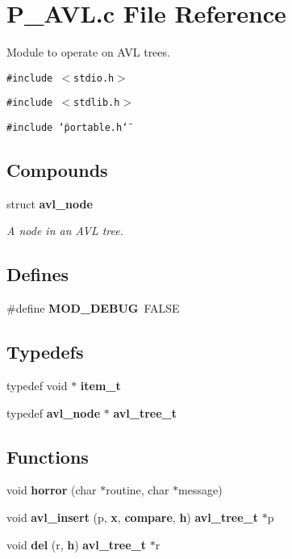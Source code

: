 \section{P\_\-AVL.c File Reference}
\label{P__AVL_8c}
Module to operate on AVL trees. 


{\tt \#include $<$stdio.h$>$}\par
{\tt \#include $<$stdlib.h$>$}\par
{\tt \#include \char`\"{}portable.h\char`\"{}}\par
\subsection*{Compounds}
\begin{CompactItemize}
\item 
struct {\bf avl\_\-node}
\begin{CompactList}\small\item\em A node in an AVL tree.\item\end{CompactList}\end{CompactItemize}
\subsection*{Defines}
\begin{CompactItemize}
\item 
\#define {\bf MOD\_\-DEBUG}\ FALSE
\end{CompactItemize}
\subsection*{Typedefs}
\begin{CompactItemize}
\item 
typedef void $\ast$ {\bf item\_\-t}
\item 
typedef {\bf avl\_\-node} $\ast$ {\bf avl\_\-tree\_\-t}
\end{CompactItemize}
\subsection*{Functions}
\begin{CompactItemize}
\item 
void {\bf horror} (char $\ast$routine, char $\ast$message)
\item 
void {\bf avl\_\-insert} (p, {\bf x}, {\bf compare}, {\bf h}) {\bf avl\_\-tree\_\-t} $\ast$p
\item 
void {\bf del} (r, {\bf h}) {\bf avl\_\-tree\_\-t} $\ast$r
\end{CompactItemize}
